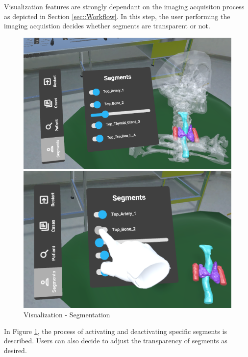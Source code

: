 Visualization features are strongly dependant on the imaging acquisiton process as depicted in Section \ref{sec::Workflow}.
In this step, the user performing the imaging acquistion decides whether segments are transparent or not.
\begin{figure}
  \centering
  \begin{minipage}{.5\textwidth}
    \centering
    \includegraphics[width=0.95\linewidth]{images/implementation/features/visualization/segments_1.png}
  \end{minipage}%
  \begin{minipage}{.5\textwidth}
    \centering
    \includegraphics[width=0.95\linewidth]{images/implementation/features/visualization/segments_2.png}
  \end{minipage}
  \caption{\label{fig::Segmentation}Visualization - Segmentation}
\end{figure}

In Figure \ref{fig::Segmentation}, the process of activating and deactivating specific segments is described.
Users can also decide to adjust the transparency of segments as desired.

